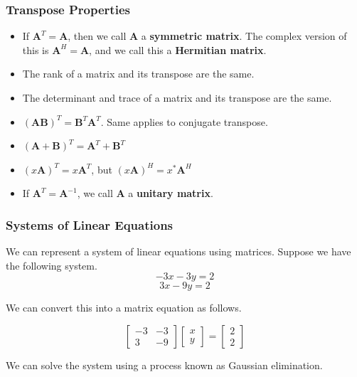 \documentclass[10pt]{beamer}
\begin{document}
\begin{frame}
  \frametitle{Transpose Properties}
  \begin{itemize}
  \item If $\mathbf{A}^T = \mathbf{A}$, then we call $\mathbf{A}$ a \textbf{symmetric matrix}. The complex version of this is $\mathbf{A}^H = \mathbf{A}$, and we call this a \textbf{Hermitian matrix}.
  \item The rank of a matrix and its transpose are the same.
  \item The determinant and trace of a matrix and its transpose are the same.
  \item $\left(\mathbf{AB}\right)^T = \mathbf{B}^T\mathbf{A}^T$. Same applies to conjugate transpose.
  \item $\left(\mathbf{A} + \mathbf{B}\right)^T = \mathbf{A}^T + \mathbf{B}^T$
  \item $\left(x\mathbf{A}\right)^T = x\mathbf{A}^T$, but $\left(x\mathbf{A}\right)^H = x^*\mathbf{A}^H$
  \item If $\mathbf{A}^T = \mathbf{A}^{-1}$, we call $\mathbf{A}$ a \textbf{unitary matrix}.
  \end{itemize}
\end{frame}

\begin{frame}
  \frametitle{Systems of Linear Equations}
  We can represent a system of linear equations using matrices. Suppose we have the following system.
  $$-3x - 3y = 2$$
  $$3x - 9y = 2$$

  We can convert this into a matrix equation as follows.

  $$\left[\begin{matrix}
      -3 & -3\\
      3 & -9
    \end{matrix}\right]\left[\begin{matrix}
      x\\
      y\end{matrix}\right] = \left[\begin{matrix}
      2\\
      2\end{matrix}\right]$$

  We can solve the system using a process known as Gaussian elimination.
\end{frame}
\end{document}
